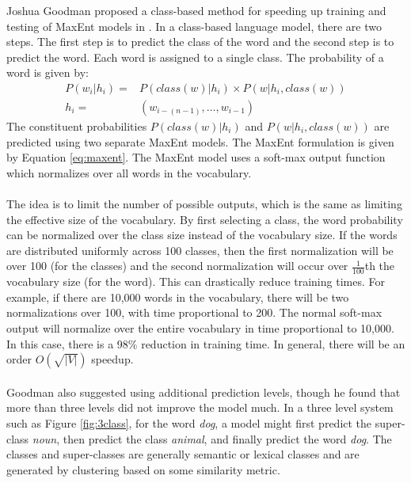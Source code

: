 Joshua Goodman proposed a class-based method for speeding up training and testing of MaxEnt models in \cite{Goodman2001}. In a class-based language model, there are two steps. The first step is to predict the class of the word and the second step is to predict the word. Each word is assigned to a single class. 
The probability of a word is given by:
\begin{align}
P(w_i | h_i)  =&  P(class(w) | h_i) \times P(w|  h_i, class(w))
\\ h_i =& ( w_{i-(n-1)},\dots, w_{i-1} ) \nonumber
\end{align}
The constituent probabilities $P\left(class(w) | h_i \right)$ and $P \left(w|  h_i, class(w) \right)$ are predicted using two separate MaxEnt models. The MaxEnt formulation is given by Equation \ref{eq:maxent}. The MaxEnt model uses a soft-max output function which normalizes over all words in the vocabulary.
\paragraph{}
The idea is to limit the number of possible outputs, which is the same as limiting the effective size of the vocabulary. By first selecting a class, the word probability can be normalized over the class size instead of the vocabulary size. If the words are distributed uniformly across 100 classes, then the first normalization will be over 100 (for the classes) and the second normalization will occur over $\frac{1}{100}$th the vocabulary size (for the word). This can drastically reduce training times. For example, if there are 10,000 words in the vocabulary, there will be two normalizations over 100, with time proportional to 200. The normal soft-max output will normalize over the entire vocabulary in time proportional to 10,000. In this case, there is a 98\% reduction in training time. In general, there will be an order $O(\sqrt{|V|})$ speedup.
\paragraph{}
Goodman also suggested using additional prediction levels, though he found that more than three levels did not improve the model much. In a three level system such as Figure \ref{fig:3class}, for the word \emph{dog}, a model might first predict the super-class \emph{noun}, then predict the class \emph{animal}, and finally predict the word \emph{dog}. The classes and super-classes are generally semantic or lexical classes and are generated by clustering based on some similarity metric.

